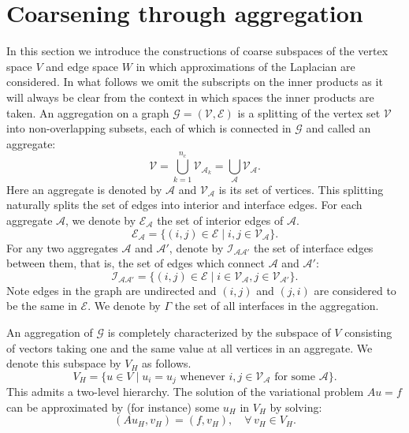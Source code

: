\documentclass[ ]{elsarticle}
\newcommand{\cA}{\mathcal{A}}
\newcommand{\cE}{\mathcal{E}}
\newcommand{\cG}{\mathcal{G}}
\newcommand{\cI}{\mathcal{I}}
\newcommand{\cV}{\mathcal{V}}
\newcommand{\mforall}{\forall\,}
\newcommand{\vsp}{V}
\newcommand{\esp}{W}
\numberwithin{equation}{section}
\begin{document}
\section{Coarsening through aggregation}
\label{sec:coarsening}
In this section we introduce the constructions of coarse subspaces of
the vertex space $\vsp$ and edge space $\esp$ in which approximations
of the Laplacian are considered. In what follows we omit the
subscripts on the inner products as it will always be clear from the
context in which spaces the inner products are taken. An aggregation
on a graph $\cG = (\cV, \cE)$ is a splitting of the vertex set $\cV$
into non-overlapping subsets, each of which is connected in $\cG$ and
called an aggregate:
\begin{equation*}
  \cV = \bigcup_{k=1}^{n_c}\cV_{\cA_k} = \bigcup_{\cA}\cV_{\cA}.
\end{equation*}
Here an aggregate is denoted by $\cA$ and $\cV_{\cA}$ is its set of
vertices. This splitting naturally splits the set of edges into
interior and interface edges. For each aggregate $\cA$, we denote by
$\cE_{\cA}$ the set of interior edges of $\cA$.
\begin{equation*}
  \cE_{\cA} = \{(i,j)\in\cE \mid i, j \in \cV_{\cA}\}.
\end{equation*}
For any two aggregates $\cA$ and $\cA'$, denote by $\cI_{\cA\cA'}$ the
set of interface edges between them, that is, the set of edges which
connect $\cA$ and $\cA'\colon$
\begin{equation*}
  \cI_{\cA\cA'} = \{(i,j)\in\cE \mid i\in\cV_{\cA}, j\in\cV_{\cA'}\}.
\end{equation*}
Note edges in the graph are undirected and $(i,j)$ and $(j,i)$ are
considered to be the same in $\cE$. We denote by $\Gamma$ the set of
all interfaces in the aggregation.

An aggregation of $\cG$ is completely characterized by the subspace of
$\vsp$ consisting of vectors taking one and the same value at all
vertices in an aggregate. We denote this subspace by $\vsp_H$ as
follows.
\begin{equation*}
  \vsp_H = \{u\in \vsp \mid u_i = u_j \text{ whenever } i,j\in \cV_{\cA}
  \text{ for some } \cA\}.
\end{equation*}
This admits a two-level hierarchy. The solution of the variational
problem $Au=f$ can be approximated by (for instance) some $u_H$ in
$\vsp_H$ by solving:
\begin{equation}\label{eq:uH}
  (Au_H, v_H) = (f, v_H), \quad \mforall v_H\in \vsp_H.
\end{equation}
\end{document}

